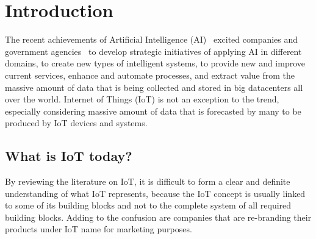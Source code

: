 \documentclass[english, 12pt, a4paper, elec, utf8, online]{aaltothesis}
\begin{document}
\section{Introduction}
\thispagestyle{empty}
The recent achievements of Artificial Intelligence (AI)~\cite{tan_lim_2018}  excited companies and government agencies~\cite{temreport2017} to develop strategic initiatives of applying AI in different domains, to create new types of intelligent systems, to provide new and improve current services, enhance and automate processes, and extract value from the massive amount of data that is being collected and stored in big datacenters all over the world. Internet of Things (IoT) is not an exception to the trend, especially considering massive amount of data that is forecasted by many to be produced by IoT devices and systems.

\subsection{What is IoT today?}
By reviewing the literature on IoT, it is difficult to form a clear and definite understanding of what IoT represents, because the IoT concept is usually linked to some of its building blocks and not to the complete system of all required building blocks. Adding to the confusion are companies that are re-branding their products under IoT name for marketing purposes.~\cite{AtzoriIM17}
\end{document}
